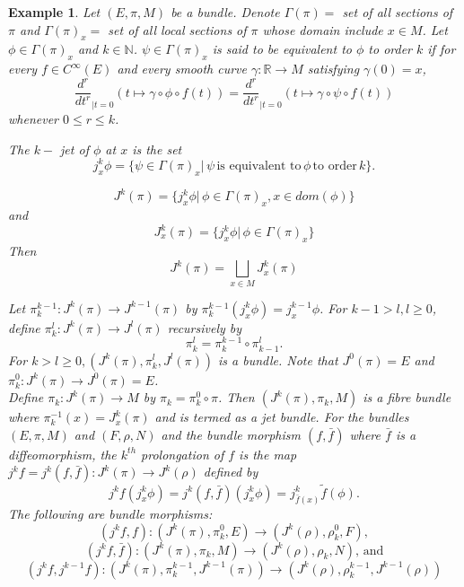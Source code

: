 \documentclass{amsart}
\theoremstyle{plain}
\newtheorem{exam}{Example}
\begin{document}
\begin{exam}
	Let $(E,\pi, M)$ be a bundle. Denote $\Gamma(\pi)=$ set of all sections of $\pi$ and $\Gamma(\pi)_x=$ set of all local sections of $\pi$ whose domain include $ x \in M$.
	Let $\phi \in \Gamma(\pi)_x$ and $k \in \mathbb{N}$. $\psi \in \Gamma(\pi)_x$ is said to be equivalent to $\phi$ to order $k$ if for every $f \in C^{\infty}(E)$ and every smooth curve $\gamma: \mathbb{R} \rightarrow M$ satisfying $\gamma(0) = x$,
	$$\frac{d^r}{dt^r}_{|t=0} (t \mapsto \gamma \circ \phi \circ f (t)) = \frac{d^r}{dt^r}_{|t=0} (t \mapsto \gamma \circ \psi \circ f (t)) $$ whenever $0 \leq r \leq k$.
	\par{}
	The $k-$ jet of $\phi$ at $x$ is the set $$ j_x^k\phi = \{\psi \in \Gamma(\pi)_x| \, \psi \, \text{is equivalent to} \, \phi \, \text{to order}\, k \}.$$
	
	
		$$ J^k(\pi) = \{ j_x^k\phi | \, \phi \in \Gamma(\pi)_x, x \in dom(\phi) \}$$ and 
		$$J_x^k(\pi) = \{ j_x^k\phi | \, \phi \in \Gamma(\pi)_x \}$$
	Then \[ J^k(\pi) = \bigsqcup_{x \in M} J^k_x(\pi)\]
	
	
	Let $\pi_k^{k-1}: J^k(\pi) \rightarrow J^{k-1}(\pi)$ by $\pi_k^{k-1}(j_x^k\phi) = j_x^{k-1} \phi$. For $k-1 > l, l \geq 0$, define $\pi_k^l: J^k(\pi) \rightarrow J^l(\pi)$ recursively by $$ \pi_k^l = \pi_k^{k-1} \circ \pi_{k-1}^l.$$ For $k > l \geq 0, (J^k(\pi), \pi_k^l, J^l(\pi))$ is a bundle. 	Note that $J^0(\pi) = E$ and $\pi_k^0: J^k(\pi) \rightarrow J^0(\pi) = E$.\\
	Define $\pi_k: J^k(\pi) \rightarrow M$ by $\pi_k = \pi_k^0 \circ \pi$. Then $(J^k(\pi), \pi_k, M)$ is a fibre bundle where $\pi_k^{-1}(x) = J_x^k(\pi)$ and is termed as a  jet bundle. For the bundles $(E, \pi, M)$ and $ (F, \rho, N)$  and the bundle morphism $(f,\bar{f})$  where $\bar{f}$ is a diffeomorphism, the $k^{th}$ prolongation of $f$ is the map $j^kf = j^k(f,\bar{f}): J^k(\pi) \rightarrow J^k(\rho)$ defined by $$j^kf(j^k_x \phi) = j^k(f,\bar{f})(j^k_x \phi) = j^k_{\bar{f}(x)}\tilde{f}(\phi).$$
	The following are bundle morphisms:\\
	$$(j^kf,f): (J^k(\pi), \pi_k^0, E) \rightarrow (J^k(\rho), \rho_k^0, F), $$  $$(j^kf,\bar{f}): (J^k(\pi), \pi_k, M) \rightarrow (J^k(\rho), \rho_k, N), \, \text{and}$$   $$(j^kf,j^{k-1}f): (J^k(\pi), \pi_k^{k-1}, J^{k-1}(\pi)) \rightarrow (J^k(\rho), \rho_k^{k-1},J^{k-1}(\rho))$$ 
	

\end{exam}
\end{document}
